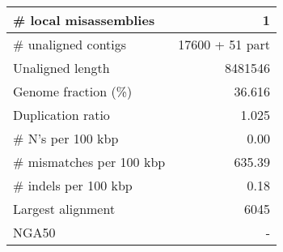 \documentclass[12pt,a4paper]{article}
\begin{document}
\begin{table}[ht]
\begin{center}
\begin{tabular}{|l*{1}{|r}|}
\# local misassemblies & 1 \\ \hline
\# unaligned contigs & 17600 + 51 part \\ \hline
Unaligned length & 8481546 \\ \hline
Genome fraction (\%) & 36.616 \\ \hline
Duplication ratio & 1.025 \\ \hline
\# N's per 100 kbp & 0.00 \\ \hline
\# mismatches per 100 kbp & 635.39 \\ \hline
\# indels per 100 kbp & 0.18 \\ \hline
Largest alignment & 6045 \\ \hline
NGA50 & - \\ \hline
\end{tabular}
\end{center}
\end{table}
\end{document}

